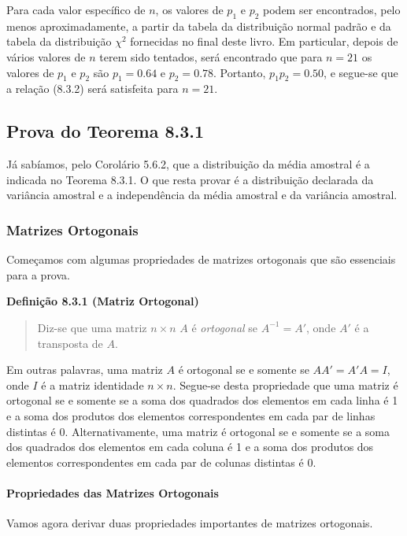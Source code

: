 Para cada valor específico de $n$, os valores de $p_1$ e $p_2$ podem ser encontrados, pelo menos aproximadamente, a partir da tabela da distribuição normal padrão e da tabela da distribuição $\chi^2$ fornecidas no final deste livro. Em particular, depois de vários valores de $n$ terem sido tentados, será encontrado que para $n=21$ os valores de $p_1$ e $p_2$ são $p_1 = 0.64$ e $p_2 = 0.78$. Portanto, $p_1 p_2 = 0.50$, e segue-se que a relação (8.3.2) será satisfeita para $n=21$.

\subsection*{Prova do Teorema 8.3.1}

Já sabíamos, pelo Corolário 5.6.2, que a distribuição da média amostral é a indicada no Teorema 8.3.1. O que resta provar é a distribuição declarada da variância amostral e a independência da média amostral e da variância amostral.

\subsubsection*{Matrizes Ortogonais}
Começamos com algumas propriedades de matrizes ortogonais que são essenciais para a prova.

\vspace{1em}
\noindent\textbf{Definição 8.3.1 (Matriz Ortogonal)}
\begin{quote}
    Diz-se que uma matriz $n \times n$ $A$ é \textit{ortogonal} se $A^{-1} = A'$, onde $A'$ é a transposta de $A$.
\end{quote}
\vspace{1em}

Em outras palavras, uma matriz $A$ é ortogonal se e somente se $AA' = A'A = I$, onde $I$ é a matriz identidade $n \times n$. Segue-se desta propriedade que uma matriz é ortogonal se e somente se a soma dos quadrados dos elementos em cada linha é 1 e a soma dos produtos dos elementos correspondentes em cada par de linhas distintas é 0. Alternativamente, uma matriz é ortogonal se e somente se a soma dos quadrados dos elementos em cada coluna é 1 e a soma dos produtos dos elementos correspondentes em cada par de colunas distintas é 0.

\paragraph{Propriedades das Matrizes Ortogonais} Vamos agora derivar duas propriedades importantes de matrizes ortogonais.

